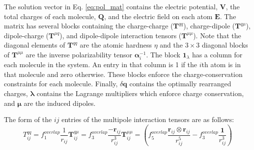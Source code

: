 \documentclass[journal=jacsat,manuscript=article]{achemso}
\begin{document}
The solution vector in Eq. \ref{eq:pol_mat} contains the electric potential, $\bm{V}$, the total charges of each molecule, $\bm{Q}$, and the electric field on each atom $\bm{E}$. The matrix has several blocks containing the charge-charge ($\bm{T}^{qq}$), charge-dipole ($\bm{T}^{q\mu}$), dipole-charge ($\bm{T}^{\mu q}$), and dipole-dipole interaction tensors ($\bm{T}^{\mu\mu}$). Note that the diagonal elements of $\bm{T}^{qq}$ are the atomic hardness $\eta$ and the $3\times 3$ diagonal blocks of $\bm{T}^{\mu\mu}$ are the inverse polarizability tensor $\bm{\alpha}_i^{-1}$. The block $\bm{1}_\lambda$ has a column for each molecule in the system. An entry in that column is 1 if the $i$th atom is in that molecule and zero otherwise. These blocks enforce the charge-conservation constraints for each molecule. Finally, $\delta\bm{q}$ contains the optimally rearranged charges, $\bm{\lambda}$ contains the Lagrange multipliers which enforce charge conservation, and $\bm{\mu}$ are the induced dipoles.

The form of the $ij$ entries of the multipole interaction tensors are as follows:
\begin{subequations}
  \begin{equation}
    T^{qq}_{ij}=f_1^{overlap}\frac{1}{r_{ij}}
    \label{eq:tensors_a}
  \end{equation}
  \begin{equation}
  \bm{T}^{q\mu}_{ij}=f_3^{overlap}\frac{-\bm{r}_{ij}}{r_{ij}^3}
    \label{eq:tensors_b}
  \end{equation}
  \begin{equation}
  \bm{T}^{\mu\mu}_{ij}=\left(f_5^{overlap}\frac{\bm{r}_{ij}\otimes\bm{r}_{ij}}{r_{ij}^5}-f_3^{overlap}\frac{\bm{1}}{r_{ij}^3}\right)
    \label{eq:tensors_c}
  \end{equation}
  \label{eq:tensors}
\end{subequations}
\end{document}
